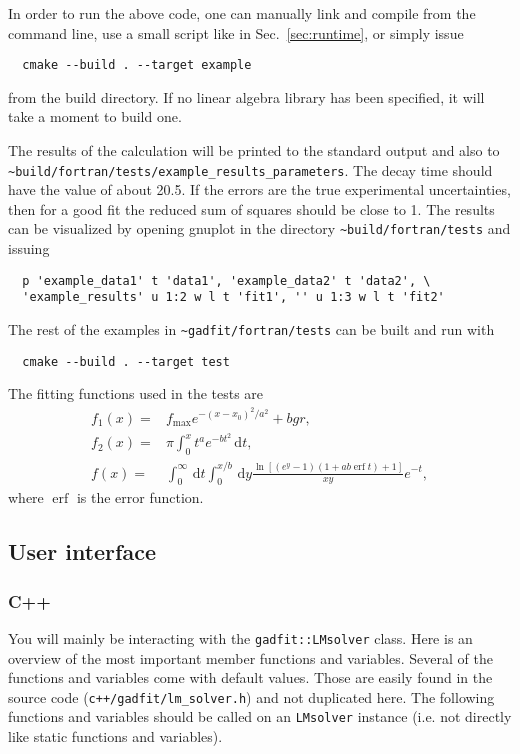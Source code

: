 \documentclass{article}
\newcommand{\D}{\,\textrm{d}}
\DeclareMathOperator{\erf}{erf}
\begin{document}
In order to run the above code, one can manually link and compile from the command line, use a small script like in Sec.~\ref{sec:runtime}, or simply issue
\begin{verbatim}
  cmake --build . --target example
\end{verbatim}
from the build directory. If no linear algebra library has been specified, it will take a moment to build one.

The results of the calculation will be printed to the standard output and also to \verb+~build/fortran/tests/example_results_parameters+. The decay time should have the value of about 20.5. If the errors are the true experimental uncertainties, then for a good fit the reduced sum of squares should be close to 1. The results can be visualized by opening gnuplot in the directory \verb+~build/fortran/tests+ and issuing
\begin{verbatim}
  p 'example_data1' t 'data1', 'example_data2' t 'data2', \
  'example_results' u 1:2 w l t 'fit1', '' u 1:3 w l t 'fit2'
\end{verbatim}
The rest of the examples in \verb+~gadfit/fortran/tests+ can be built and run with
\begin{verbatim}
  cmake --build . --target test
\end{verbatim}
The fitting functions used in the tests are
\begin{equation*}
  \begin{split}
    f_1(x) =& f_{\text{max}}e^{-(x-x_0)^2/a^2}+bgr, \\
    f_2(x) =& \pi \int_0^x t^ae^{-bt^2} \D t, \\
    f(x) =& \int_0^\infty \D t \int_0^{x/b} \D y
    \frac{\ln[(e^y-1)(1+ab \erf t)+1]}{xy} e^{-t},
  \end{split}
\end{equation*}
where $\erf$ is the error function.

\subsection{User interface}

\subsubsection{C++}

You will mainly be interacting with the \verb+gadfit::LMsolver+ class. Here is an overview of the most important member functions and variables. Several of the functions and variables come with default values. Those are easily found in the source code (\texttt{c++/gadfit/lm\_solver.h}) and not duplicated here. The following functions and variables should be called on an \texttt{LMsolver} instance (i.e. not directly like static functions and variables).
\end{document}

